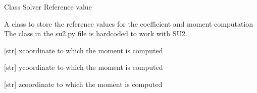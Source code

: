 \documentclass[letterpaper,10pt,english]{sphinxmanual}
\begin{document}
\begin{fulllineitems}
\label{\detokenize{modules:su2.Solver_Reference_Value}}
\pysigstartsignatures
{}
\pysigstopsignatures
\sphinxAtStartPar
Class Solver Reference value

\sphinxAtStartPar
A class to store the reference values for the coefficient and moment computation
The class in the su2.py file is hardcoded to work with SU2.

\begin{fulllineitems}
\label{\detokenize{modules:su2.Solver_Reference_Value.origin_moment_x}}
\pysigstartsignatures
{}
\pysigstopsignatures
\sphinxAtStartPar
{[}str{]} x\sphinxhyphen{}coordinate to which the moment is computed

\end{fulllineitems}


\begin{fulllineitems}
\label{\detokenize{modules:su2.Solver_Reference_Value.origin_moment_y}}
\pysigstartsignatures
{}
\pysigstopsignatures
\sphinxAtStartPar
{[}str{]} y\sphinxhyphen{}coordinate to which the moment is computed

\end{fulllineitems}


\begin{fulllineitems}
\label{\detokenize{modules:su2.Solver_Reference_Value.origin_moment_z}}
\pysigstartsignatures
{}
\pysigstopsignatures
\sphinxAtStartPar
{[}str{]} z\sphinxhyphen{}coordinate to which the moment is computed

\end{fulllineitems}



\end{fulllineitems}
\end{document}
